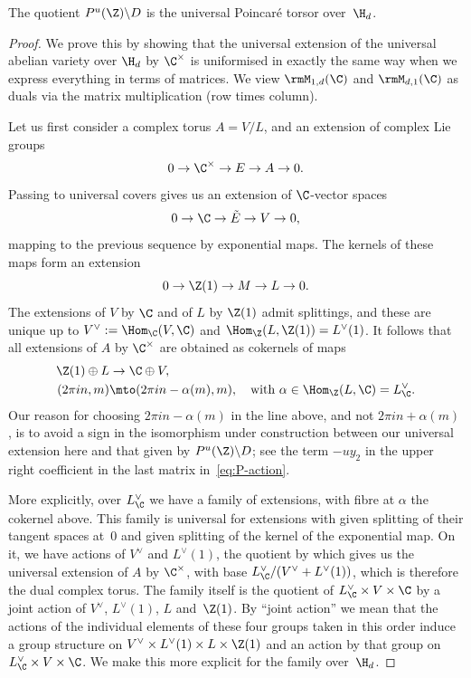 \begin{Proposition}\label{prop:MSV_and_PT}
The quotient $P^u(\Z)\backslash D$ is the universal Poincaré torsor over~$\H_d$.
\end{Proposition}
\begin{proof}
We prove this by showing that the universal extension of the
universal abelian variety over $\H_d$ by $\C^\times$ is uniformised
in exactly the same way when we express everything in terms of
matrices. We view $\rmM_{1,d}(\C)$ and $\rmM_{d,1}(\C)$ as duals via
the matrix multiplication (row times column).

Let us first consider a complex torus $A=V/L$, and an extension of
complex Lie groups
\[
0 \to \C^\times \to E \to A \to 0.
\]
Passing to universal covers gives us an extension of $\C$-vector
spaces
\[
0 \to \C \to \tilde{E} \to V \to 0,
\]
mapping to the previous sequence by exponential maps. The kernels of
these maps form an extension
\[
0 \to \Z(1) \to M \to L \to 0.
\]
The extensions of $V$ by $\C$ and of $L$ by $\Z(1)$ admit splittings,
and these are unique up to $V^\vee:=\Hom_\C(V,\C)$ and
$\Hom_\Z(L,\Z(1))=L^\vee(1)$. It follows that all extensions of $A$ by
$\C^\times$ are obtained as cokernels of maps
\begin{equation}\label{eq:cokernels}
\begin{aligned}
\Z(1)\oplus L & \to \C\oplus V,\\
(2\pi in,m)& \mto (2\pi i n - \alpha(m),m),\quad \text{with
$\alpha\in\Hom_\Z(L,\C)=L_\C^\vee$.}
\end{aligned}
\end{equation}
Our reason for choosing $2\pi i n-\alpha(m)$ in the line above, and
not $2\pi i n+\alpha(m)$, is to avoid a sign in the isomorphism under
construction between our universal extension here and that given by
$P^u(\Z)\backslash D$; see the term $-uy_2$ in the upper right
coefficient in the last matrix in~\eqref{eq:P-action}.

More explicitly, over $L_\C^\vee$ we have a family of extensions, with
fibre at $\alpha$ the cokernel above. This family is universal for
extensions with given splitting of their tangent spaces at~$0$ and
given splitting of the kernel of the exponential map. On it, we have
actions of $V^\vee$ and $L^\vee(1)$, the quotient by which gives us
the universal extension of $A$ by $\C^\times$, with base
$L_\C^\vee/(V^\vee+L^\vee(1))$, which is therefore the dual complex
torus. The family itself is the quotient of $L_\C^\vee\times
V\times\C$ by a joint action of $V^\vee$, $L^\vee(1)$, $L$
and~$\Z(1)$. By ``joint action'' we mean that the actions of the
individual elements of these four groups taken in this order induce a
group structure on $V^\vee\times L^\vee(1)\times L\times\Z(1)$ and an
action by that group on $L_\C^\vee\times V\times\C$. We make this more
explicit for the family over~$\H_d$.


\end{proof}
